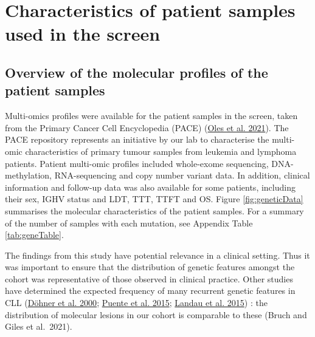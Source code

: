 \documentclass[11pt, a4paper, twosided]{book}
\begin{document}
\hypertarget{characteristics-of-patient-samples-used-in-the-screen}{%
\section{Characteristics of patient samples used in the screen}\label{characteristics-of-patient-samples-used-in-the-screen}}

\hypertarget{overview-of-the-molecular-profiles-of-the-patient-samples}{%
\subsection{Overview of the molecular profiles of the patient samples}\label{overview-of-the-molecular-profiles-of-the-patient-samples}}

Multi-omics profiles were available for the patient samples in the screen, taken from the Primary Cancer Cell Encyclopedia (PACE) (\protect\hyperlink{ref-R-BloodCancerMultiOmics2017}{Oles et al. 2021}). The PACE repository represents an initiative by our lab to characterise the multi-omic characteristics of primary tumour samples from leukemia and lymphoma patients. Patient multi-omic profiles included whole-exome sequencing, DNA-methylation, RNA-sequencing and copy number variant data. In addition, clinical information and follow-up data was also available for some patients, including their sex, IGHV status and LDT, TTT, TTFT and OS. Figure \ref{fig:geneticData} summarises the molecular characteristics of the patient samples. For a summary of the number of samples with each mutation, see Appendix Table \ref{tab:geneTable}.

The findings from this study have potential relevance in a clinical setting. Thus it was important to ensure that the distribution of genetic features amongst the cohort was representative of those observed in clinical practice. Other studies have determined the expected frequency of many recurrent genetic features in CLL (\protect\hyperlink{ref-Dohner2000}{Döhner et al. 2000}; \protect\hyperlink{ref-Puente2015}{Puente et al. 2015}; \protect\hyperlink{ref-Landau2015}{Landau et al. 2015}) : the distribution of molecular lesions in our cohort is comparable to these (Bruch and Giles et al.~2021).
\end{document}
